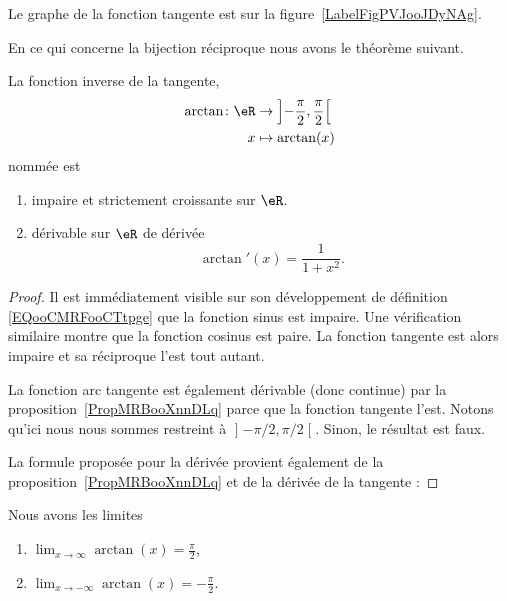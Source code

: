 	Le graphe de la fonction tangente est sur la figure~\ref{LabelFigPVJooJDyNAg}. %
	\newcommand{\CaptionFigPVJooJDyNAg}{Le graphe de la fonction tangente.}
	

	En ce qui concerne la bijection réciproque nous avons le théorème suivant.
	\begin{theorem}     \label{THOooUSVGooOAnCvC}
		La fonction inverse de la tangente,
		\begin{equation}
			\begin{aligned}
				\arctan\colon \eR & \to \left] -\frac{ \pi }{2} , \frac{ \pi }{2} \right[ \\
				x                 & \mapsto \arctan(x)
			\end{aligned}
		\end{equation}
		nommée  est
		\begin{enumerate}
			\item
			      impaire et strictement croissante sur \( \eR\).
			\item       \label{ITEMooMNHLooOVhIIb}
			      dérivable sur \( \eR\) de dérivée
			      \begin{equation}        \label{EQooGCHGooPlwYWt}
				      \arctan'(x)=\frac{1}{ 1+x^2 }.
			      \end{equation}
		\end{enumerate}
	\end{theorem}

	\begin{proof}
		Il est immédiatement visible sur son développement de définition \eqref{EQooCMRFooCTtpge} que la fonction sinus est impaire. Une vérification similaire montre que la fonction cosinus est paire. La fonction tangente est alors impaire et sa réciproque l'est tout autant.

		La fonction arc tangente est également dérivable (donc continue) par la proposition~\ref{PropMRBooXnnDLq} parce que la fonction tangente l'est. Notons qu'ici nous nous sommes restreint à \( \mathopen] -\pi/2 , \pi/2 \mathclose[\). Sinon, le résultat est faux.

		La formule proposée pour la dérivée provient également de la proposition~\ref{PropMRBooXnnDLq} et de la dérivée de la tangente :
	\end{proof}

	\begin{lemma}       \label{LEMooHRDCooGtnyeQ}
		Nous avons les limites
		\begin{enumerate}
			\item
			      $\lim_{x\to \infty} \arctan(x)=\frac{ \pi }{2}$,
			\item
			      \( \lim_{x\to -\infty} \arctan(x)=-\frac{ \pi }{2}\).
		\end{enumerate}
	\end{lemma}


